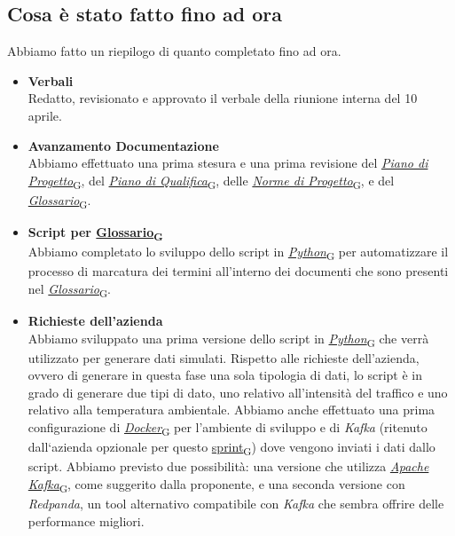 \documentclass[italian,12pt]{article}
\begin{document}
\subsection{Cosa è stato fatto fino ad ora}
Abbiamo fatto un riepilogo di quanto completato fino ad ora.
\begin{itemize}
	\item \textbf{Verbali} \\
	Redatto, revisionato e approvato il verbale della riunione interna del 10 aprile.
	\item \textbf{Avanzamento Documentazione} \\
	Abbiamo effettuato una prima stesura e una prima revisione del \href{https://7last.github.io/docs/rtb/documentazione-interna/glossario#piano-di-progetto}{\textit{Piano di Progetto}\textsubscript{G}}, del \href{https://7last.github.io/docs/rtb/documentazione-interna/glossario#piano-di-qualifica}{\textit{Piano di Qualifica}\textsubscript{G}}, delle \href{https://7last.github.io/docs/rtb/documentazione-interna/glossario#norme-di-progetto}{\textit{Norme di Progetto}\textsubscript{G}}, e del \href{https://7last.github.io/docs/rtb/documentazione-interna/glossario#glossario}{\textit{Glossario}\textsubscript{G}}.
	\item \textbf{Script per \href{https://7last.github.io/docs/rtb/documentazione-interna/glossario#glossario}{Glossario\textsubscript{G}}} \\
	Abbiamo completato lo sviluppo dello script in \href{https://7last.github.io/docs/rtb/documentazione-interna/glossario#python}{\textit{Python}\textsubscript{G}} per automatizzare il processo di marcatura dei termini all'interno dei documenti che sono presenti nel \href{https://7last.github.io/docs/rtb/documentazione-interna/glossario#glossario}{\textit{Glossario}\textsubscript{G}}.
	\item \textbf{Richieste dell'azienda} \\
	Abbiamo sviluppato una prima versione dello script in \href{https://7last.github.io/docs/rtb/documentazione-interna/glossario#python}{\textit{Python}\textsubscript{G}} che verrà utilizzato per generare dati simulati. Rispetto alle richieste dell'azienda, ovvero di generare in questa fase una sola tipologia di dati, lo script è in grado di generare due tipi di dato, uno relativo all'intensità del traffico e uno relativo alla temperatura ambientale. Abbiamo anche effettuato una prima configurazione di \href{https://7last.github.io/docs/rtb/documentazione-interna/glossario#docker}{\textit{Docker}\textsubscript{G}} per l'ambiente di sviluppo e di \textit{Kafka} (ritenuto dall`azienda opzionale per questo \href{https://7last.github.io/docs/rtb/documentazione-interna/glossario#sprint}{sprint\textsubscript{G}}) dove vengono inviati i dati dallo script. Abbiamo previsto due possibilità: una versione che utilizza \href{https://7last.github.io/docs/rtb/documentazione-interna/glossario#apache-kafka}{\textit{Apache Kafka}\textsubscript{G}}, come suggerito dalla proponente, e una seconda versione con \textit{Redpanda}, un tool alternativo compatibile con \textit{Kafka} che sembra offrire delle performance migliori.
\end{itemize}
\end{document}
